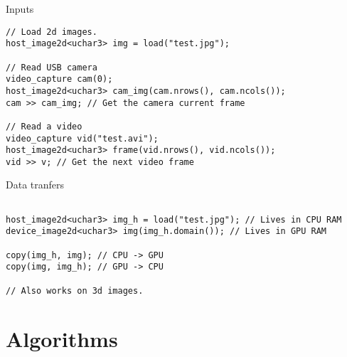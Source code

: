 \documentclass{beamer}
\begin{document}
\begin{frame}[containsverbatim]{Inputs}
\begin{lstlisting}
// Load 2d images.
host_image2d<uchar3> img = load("test.jpg");

// Read USB camera
video_capture cam(0);
host_image2d<uchar3> cam_img(cam.nrows(), cam.ncols());
cam >> cam_img; // Get the camera current frame

// Read a video
video_capture vid("test.avi");
host_image2d<uchar3> frame(vid.nrows(), vid.ncols());
vid >> v; // Get the next video frame
\end{lstlisting}
\end{frame}

\begin{frame}[containsverbatim]{Data tranfers}
\begin{lstlisting}

host_image2d<uchar3> img_h = load("test.jpg"); // Lives in CPU RAM
device_image2d<uchar3> img(img_h.domain()); // Lives in GPU RAM

copy(img_h, img); // CPU -> GPU
copy(img, img_h); // GPU -> CPU

// Also works on 3d images.
\end{lstlisting}
\end{frame}


\section{Algorithms}
\end{document}
